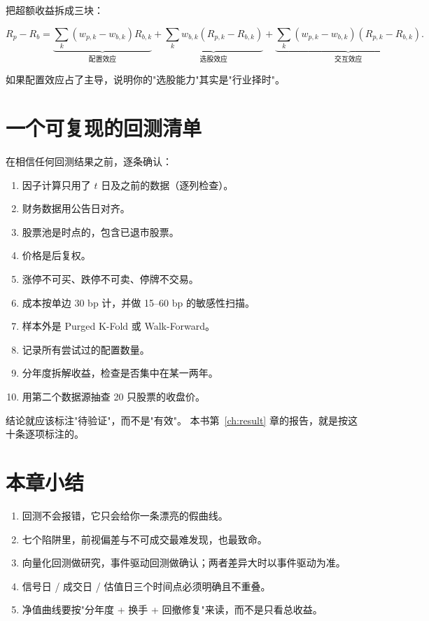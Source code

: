 把超额收益拆成三块：

\begin{equation}
  R_p - R_b = \underbrace{\sum_k (w_{p,k} - w_{b,k})R_{b,k}}_{\text{配置效应}}
  + \underbrace{\sum_k w_{b,k}(R_{p,k} - R_{b,k})}_{\text{选股效应}}
  + \underbrace{\sum_k (w_{p,k}-w_{b,k})(R_{p,k}-R_{b,k})}_{\text{交互效应}}.
\end{equation}

如果配置效应占了主导，说明你的"选股能力"其实是"行业择时"。

\section{一个可复现的回测清单}

在相信任何回测结果之前，逐条确认：

\begin{enumerate}
  \item 因子计算只用了 $t$ 日及之前的数据（逐列检查）。
  \item 财务数据用公告日对齐。
  \item 股票池是时点的，包含已退市股票。
  \item 价格是后复权。
  \item 涨停不可买、跌停不可卖、停牌不交易。
  \item 成本按单边 30 bp 计，并做 15--60 bp 的敏感性扫描。
  \item 样本外是 Purged K-Fold 或 Walk-Forward。
  \item 记录所有尝试过的配置数量。
  \item 分年度拆解收益，检查是否集中在某一两年。
  \item 用第二个数据源抽查 20 只股票的收盘价。
\end{enumerate}

\begin{keybox}[十条里只要有一条没做到]
结论就应该标注"待验证"，而不是"有效"。
本书第~\ref{ch:result} 章的报告，就是按这十条逐项标注的。
\end{keybox}

\section{本章小结}

\begin{enumerate}
  \item 回测不会报错，它只会给你一条漂亮的假曲线。
  \item 七个陷阱里，前视偏差与不可成交最难发现，也最致命。
  \item 向量化回测做研究，事件驱动回测做确认；两者差异大时以事件驱动为准。
  \item 信号日 / 成交日 / 估值日三个时间点必须明确且不重叠。
  \item 净值曲线要按"分年度 + 换手 + 回撤修复"来读，而不是只看总收益。
\end{enumerate}
